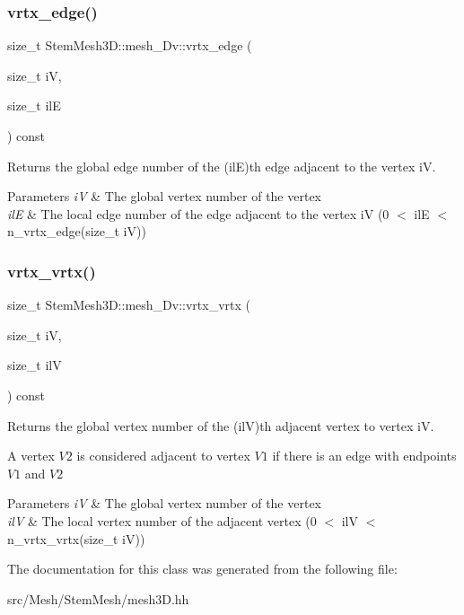 \subsubsection{\texorpdfstring{vrtx\+\_\+edge()}{vrtx\_edge()}}
{\footnotesize\ttfamily size\+\_\+t Stem\+Mesh3\+D\+::mesh\+\_\+Dv\+::vrtx\+\_\+edge (\begin{DoxyParamCaption}\item[{size\+\_\+t}]{iV,  }\item[{size\+\_\+t}]{ilE }\end{DoxyParamCaption}) const}



Returns the global edge number of the (ilE)\textquotesingle{}th edge adjacent to the vertex iV. 


\begin{DoxyParams}{Parameters}
{\em iV} & The global vertex number of the vertex \\
\hline
{\em ilE} & The local edge number of the edge adjacent to the vertex iV (0 $<$ ilE $<$ n\+\_\+vrtx\+\_\+edge(size\+\_\+t i\+V)) \\
\hline
\end{DoxyParams}
\mbox{\label{classStemMesh3D_1_1mesh__3Dv_afbe4f73847a1ae2c6a24170ab3a7827e}} 
\subsubsection{\texorpdfstring{vrtx\+\_\+vrtx()}{vrtx\_vrtx()}}
{\footnotesize\ttfamily size\+\_\+t Stem\+Mesh3\+D\+::mesh\+\_\+Dv\+::vrtx\+\_\+vrtx (\begin{DoxyParamCaption}\item[{size\+\_\+t}]{iV,  }\item[{size\+\_\+t}]{ilV }\end{DoxyParamCaption}) const}



Returns the global vertex number of the (ilV)\textquotesingle{}th adjacent vertex to vertex iV. 

A vertex $V2$ is considered adjacent to vertex $V1$ if there is an edge with endpoints $V1$ and $V2$ 
\begin{DoxyParams}{Parameters}
{\em iV} & The global vertex number of the vertex \\
\hline
{\em ilV} & The local vertex number of the adjacent vertex (0 $<$ ilV $<$ n\+\_\+vrtx\+\_\+vrtx(size\+\_\+t i\+V)) \\
\hline
\end{DoxyParams}


The documentation for this class was generated from the following file\+:\begin{DoxyCompactItemize}
\item 
src/\+Mesh/\+Stem\+Mesh/mesh3\+D.\+hh\end{DoxyCompactItemize}

